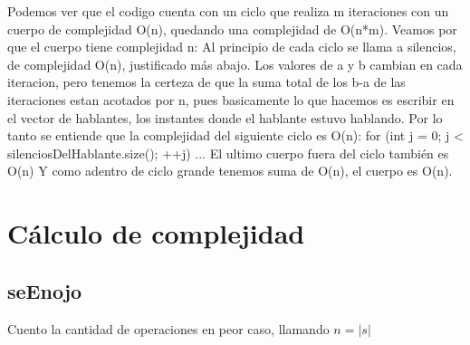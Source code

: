 \documentclass{article}
\begin{document}
Podemos ver que el codigo cuenta con un ciclo que realiza m iteraciones con un cuerpo de complejidad O(n), quedando una
complejidad de O(n*m). \newline
Veamos por que el cuerpo tiene complejidad n: \newline
Al principio de cada ciclo se llama a silencios, de complejidad O(n), justificado más abajo. \newline
Los valores de a y b cambian en cada iteracion, pero tenemos la certeza de que la suma total de los b-a de las
iteraciones estan acotados por n, pues basicamente lo que hacemos es escribir en el vector de hablantes, los instantes
donde el hablante estuvo hablando. Por lo tanto se entiende que la complejidad del siguiente ciclo es O(n): \newline
for (int j = 0; j < silenciosDelHablante.size(); ++j) { \newline
    ... \newline
} \newline
El ultimo cuerpo fuera del ciclo también es O(n) \newline
Y como adentro de ciclo grande tenemos suma de O(n), el cuerpo es O(n). \newline

\newpage
{}
\section*{Cálculo de complejidad}
\vspace{0.5cm}
\subsection{seEnojo}
Cuento la cantidad de operaciones en peor caso, llamando $n=|s|$
\end{document}
